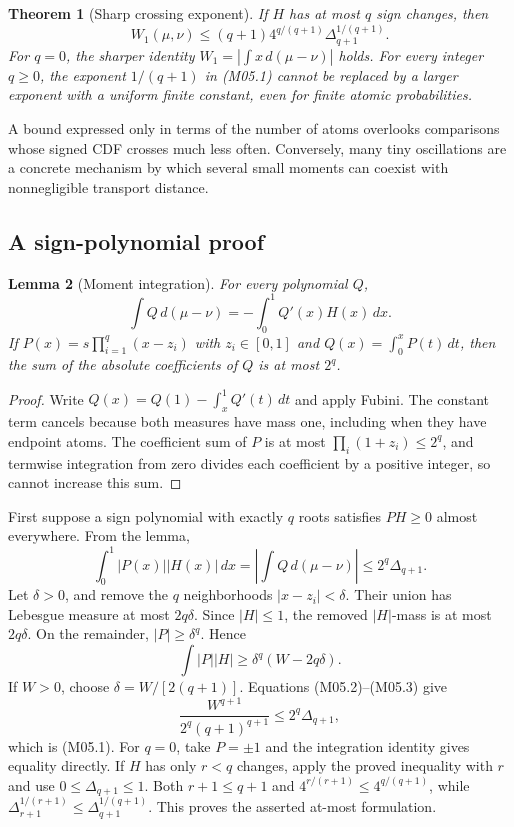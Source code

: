 \documentclass[11pt,a4paper]{article}
\newtheorem{theorem}{Theorem}[section]
\newtheorem{lemma}[theorem]{Lemma}
\theoremstyle{definition}\newtheorem{definition}[theorem]{Definition}
\theoremstyle{remark}\newtheorem{remark}[theorem]{Remark}
\numberwithin{equation}{section}
\begin{document}
\begin{theorem}[Sharp crossing exponent]\label{M05-th:main}
If $H$ has at most $q$ sign changes, then
\[
 W_1(\mu,\nu)\le(q+1)4^{q/(q+1)}\Delta_{q+1}^{1/(q+1)}.\tag{M05.1}
\]
For $q=0$, the sharper identity $W_1=|\int x\,d(\mu-\nu)|$ holds. For every integer $q\ge0$, the exponent $1/(q+1)$ in (M05.1) cannot be replaced by a larger exponent with a uniform finite constant, even for finite atomic probabilities.
\end{theorem}
A bound expressed only in terms of the number of atoms overlooks comparisons whose signed CDF crosses much less often. Conversely, many tiny oscillations are a concrete mechanism by which several small moments can coexist with nonnegligible transport distance.

\subsection{A sign-polynomial proof}\label{M05-sec-2}
\begin{lemma}[Moment integration]\label{M05-lem:ibp}
For every polynomial $Q$,
\[
 \int Q\,d(\mu-\nu)=-\int_0^1 Q'(x)H(x)\,dx.
\]
If $P(x)=s\prod_{i=1}^q(x-z_i)$ with $z_i\in[0,1]$ and $Q(x)=\int_0^xP(t)\,dt$, then the sum of the absolute coefficients of $Q$ is at most $2^q$.
\end{lemma}
\begin{proof}
Write $Q(x)=Q(1)-\int_x^1Q'(t)\,dt$ and apply Fubini. The constant term cancels because both measures have mass one, including when they have endpoint atoms. The coefficient sum of $P$ is at most $\prod_i(1+z_i)\le2^q$, and termwise integration from zero divides each coefficient by a positive integer, so cannot increase this sum.
\end{proof}

First suppose a sign polynomial with exactly $q$ roots satisfies $PH\ge0$ almost everywhere. From the lemma,
\[
 \int_0^1|P(x)||H(x)|\,dx
 =\left|\int Q\,d(\mu-\nu)\right|\le2^q\Delta_{q+1}.\tag{M05.2}
\]
Let $\delta>0$, and remove the $q$ neighborhoods $|x-z_i|<\delta$. Their union has Lebesgue measure at most $2q\delta$. Since $|H|\le1$, the removed $|H|$-mass is at most $2q\delta$. On the remainder, $|P|\ge\delta^q$. Hence
\[
 \int|P||H|\ge\delta^q(W-2q\delta).\tag{M05.3}
\]
If $W>0$, choose $\delta=W/[2(q+1)]$. Equations (M05.2)--(M05.3) give
\[
 \frac{W^{q+1}}{2^q(q+1)^{q+1}}\le2^q\Delta_{q+1},
\]
which is (M05.1). For $q=0$, take $P=\pm1$ and the integration identity gives equality directly. If $H$ has only $r<q$ changes, apply the proved inequality with $r$ and use $0\le\Delta_{q+1}\le1$. Both $r+1\le q+1$ and $4^{r/(r+1)}\le4^{q/(q+1)}$, while $\Delta_{r+1}^{1/(r+1)}\le\Delta_{q+1}^{1/(q+1)}$. This proves the asserted at-most formulation.
\end{document}
